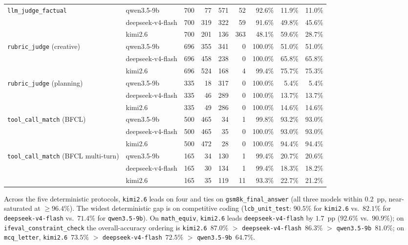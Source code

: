 \documentclass[11pt,a4paper]{article}
\begin{document}
\begin{table}[ht]
\begin{tabular}{l l r r r r r r r}
\midrule
\multirow{3}{*}{\texttt{llm\_judge\_factual}}
 & qwen3.5-9b        & 700 & 77  & 571 & 52  & \phantom{0}92.6\% & 11.9\% & 11.0\% \\
 & deepseek-v4-flash & 700 & 319 & 322 & 59  & \phantom{0}91.6\% & 49.8\% & 45.6\% \\
 & kimi2.6           & 700 & 201 & 136 & 363 & \phantom{0}48.1\% & 59.6\% & 28.7\% \\
\midrule
\multirow{3}{*}{\texttt{rubric\_judge} (creative)}
 & qwen3.5-9b        & 696 & 355 & 341 & 0 & 100.0\% & 51.0\% & 51.0\% \\
 & deepseek-v4-flash & 696 & 458 & 238 & 0 & 100.0\% & 65.8\% & 65.8\% \\
 & kimi2.6           & 696 & 524 & 168 & 4 & \phantom{0}99.4\% & 75.7\% & 75.3\% \\
\midrule
\multirow{3}{*}{\texttt{rubric\_judge} (planning)}
 & qwen3.5-9b        & 335 & 18  & 317 & 0  & 100.0\% & \phantom{0}5.4\% & \phantom{0}5.4\% \\
 & deepseek-v4-flash & 335 & 46  & 289 & 0  & 100.0\% & 13.7\% & 13.7\% \\
 & kimi2.6           & 335 & 49  & 286 & 0  & 100.0\% & 14.6\% & 14.6\% \\
\midrule
\multirow{3}{*}{\texttt{tool\_call\_match} (BFCL)}
 & qwen3.5-9b        & 500 & 465 & 34  & 1  & \phantom{0}99.8\% & 93.2\% & 93.0\% \\
 & deepseek-v4-flash & 500 & 465 & 35  & 0  & 100.0\% & 93.0\% & 93.0\% \\
 & kimi2.6           & 500 & 472 & 28  & 0  & 100.0\% & 94.4\% & 94.4\% \\
\midrule
\multirow{3}{*}{\texttt{tool\_call\_match} (BFCL multi-turn)}
 & qwen3.5-9b        & 165 & 34  & 130 & 1  & \phantom{0}99.4\% & 20.7\% & 20.6\% \\
 & deepseek-v4-flash & 165 & 30  & 134 & 1  & \phantom{0}99.4\% & 18.3\% & 18.2\% \\
 & kimi2.6           & 165 & 35  & 119 & 11 & \phantom{0}93.3\% & 22.7\% & 21.2\% \\
\bottomrule
\end{tabular}
\end{table}

Across the five deterministic protocols, \texttt{kimi2.6} leads on four and
ties on \texttt{gsm8k\_final\_answer} (all three models within $0.2$~pp,
near-saturated at $\ge 96.4\%$). The widest deterministic gap is on competitive
coding (\texttt{lcb\_unit\_test}: $90.5\%$ for \texttt{kimi2.6} vs.\ $82.1\%$
for \texttt{deepseek-v4-flash} vs.\ $71.4\%$ for \texttt{qwen3.5-9b}). On
\texttt{math\_equiv}, \texttt{kimi2.6} leads \texttt{deepseek-v4-flash} by
$1.7$~pp ($92.6\%$ vs.\ $90.9\%$); on \texttt{ifeval\_constraint\_check} the
overall-accuracy ordering is \texttt{kimi2.6}~$87.0\%$ $>$
\texttt{deepseek-v4-flash}~$86.3\%$ $>$ \texttt{qwen3.5-9b}~$81.0\%$; on
\texttt{mcq\_letter}, \texttt{kimi2.6}~$73.5\%$ $>$
\texttt{deepseek-v4-flash}~$72.5\%$ $>$ \texttt{qwen3.5-9b}~$64.7\%$.
\end{document}
